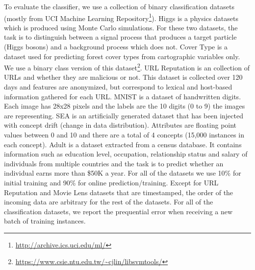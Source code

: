 \documentclass{vldb}
\begin{document}
To evaluate the classifier, we use a collection of binary classification datasets (mostly from UCI Machine Learning Repository\footnote{\url{http://archive.ics.uci.edu/ml/}}).
Higgs \cite{baldi2014searching} is a physics datasets which is produced using Monte Carlo simulations.
For these two datasets, the task is to distinguish between a signal process that produces a target particle (Higgs bosons) and a background process which does not.
Cover Type \cite{collobert2002parallel} is a dataset used for predicting forest cover types from cartographic variables only.
We use a binary class version of this dataset\footnote{\url{https://www.csie.ntu.edu.tw/~cjlin/libsvmtools/}}.
URL Reputation \cite{ma2009identifying} is an collection of URLs and whether they are malicious or not.
This dataset is collected over 120 days and features are anonymized, but correspond to lexical and host-based information gathered for each URL.
MNIST \cite{lecun-mnist} is a dataset of handwritten digits.
Each image has 28x28 pixels and the labels are the 10 digits (0 to 9) the images are representing.
SEA is an artificially generated dataset that has been injected with concept drift (change in data distribution)\cite{street2001streaming}.
Attributes are floating point values between 0 and 10 and there are a total of 4 concepts (15,000 instances in each concept).
Adult \cite{platt199912} is a dataset extracted from a census database.
It contains information such as education level, occupation, relationship status and salary of individuals from multiple countries and the task is to predict whether an individual earns more than \$50K a year. 
For all of the datasets we use 10\% for initial training and 90\% for online prediction/training.
Except for URL Reputation and Movie Lens datasets that are timestamped, the order of the incoming data are arbitrary for the rest of the datasets.
For all of the classification datasets, we report the prequential error \cite{gama2009issues} when receiving a new batch of training instances.
\end{document}
